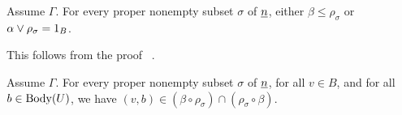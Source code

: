 \begin{lemma}
  \label{lem:fv_3-2}
Assume $\Gamma$. For every proper nonempty subset $\sigma$ of $\underline{n}$,
  either $\beta \leq \rho_\sigma$ or $\alpha \join \rho_\sigma = 1_B$.
\end{lemma}
  This follows from the proof ~\cite[Lemma~3.2]{Freese:2009}.

\begin{comment}
\begin{proof}
Let $\rho = \rho_\sigma$.
Suppose that $\beta \not\le {\rho}$ (or equivalently $(0,1) \notin
\rho$). Since $\beta$ is join irreducible, $\beta\meet\rho \le
\alpha$ and so $\beta\meet \rho = \alpha \meet \rho$.  Furthermore,
$\alpha\join {\rho} = \beta \join {\rho}$, or else we can find a
prime quotient between these two congruences that is perspective
with $\langle \alpha, \beta \rangle$.  But then the algebra
$\alg B/{\rho}$ has a prime quotient of type~\atyp\ whose minimal sets have nonempty
tails.  Since this algebra is isomorphic to a subdirect product of
fewer than $n$ members of $\mathcal S$, we conclude, by the minimality
of~$n$, that indeed $\alpha\join {\rho} = \beta \join {\rho}$.

Thus the set
\[
\mathcal P = \{\beta\meet\rho, \rho, \alpha, \beta, \alpha\join\rho\}
\]
forms a pentagon in $\Con \alg B$. Let $C$ be the
$(\alpha\join\rho)$-class that contains $0$ and let $M = C\mathrel{\cap} U$.
Note that $C$ contains $1$ and, since $\alg B$ is idempotent,  that
$C$ is a subuniverse of $\alg B$. By \cite[Lemma 2.4]{HM:1988}, we
conclude that the restriction to $M$ is a surjective lattice
homomorphism from the interval $I[0_B,
\alpha\join\rho]$ in $\Con{\alg B}$ to the interval $I[0_M,
(\alpha\join\rho)|_M]$ in $\Con{\alg B}|_M$.  Note that since $(0,1) \in
\beta|_M \mysetminus \alpha|_M$, this restriction map separates
$\alpha$ and $\beta$.  Then, the image under the restriction map of
the pentagon $\mathcal P$ is a pentagon in $\Con{\alg B}|_M$.  This
implies that $M$ contains some elements of the tail of $U$, since
otherwise $\Con{\alg B}|_M$ has a \malcev term operation and hence
is modular.
Thus, there is some $t$ in the tail of $U$ with $(0,t) \in
\alpha\join \rho$. Using Lemma~\ref{lem:fv_3-1} we conclude that $C =
B$ since it contains $\{0,1,t\}$.  Thus, $\alpha \join \rho = 1_B$.
\end{proof}

\end{comment}

\begin{lemma}\label{lem:nearperm}
Assume $\Gamma$.   For every proper nonempty subset $\sigma$ of $\underline{n}$,
  for all $v\in B$, and for all $b\in \operatorname{Body}(U)$, we have
  $(v,b) \in (\beta \circ \rho_\sigma) \cap (\rho_\sigma \circ \beta)$.
\end{lemma}

